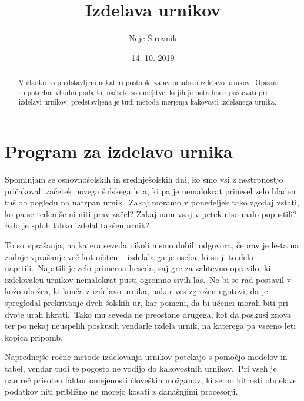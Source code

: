 \documentclass[a4paper,10pt]{article}
\begin{document}

\title{Izdelava urnikov}
\author{Nejc Širovnik}
\date{14. 10. 2019}
\maketitle


\begin{abstract}
   V članku so predstavljeni nekateri postopki za avtomatsko izdelavo urnikov.\ Opisani so
   potrebni vhodni podatki, naštete so omejitve, ki jih je potrebno upoštevati pri izdelavi
   urnikov, predstavljena je tudi metoda merjenja kakovosti izdelanega urnika.
\end{abstract}

\section{Program za izdelavo urnika} %

Spominjam se osnovnošolskih in srednješolskih dni, ko smo vsi z nestrpnostjo pričakovali
začetek novega šolskega leta, ki pa je nemalokrat prinesel zelo hladen tuš ob pogledu na
natrpan urnik.\ Zakaj moramo v ponedeljek tako zgodaj vstati, ko pa se teden še ni niti
prav začel? Zakaj nam vsaj v petek niso malo popustili? Kdo je sploh lahko izdelal
takšen urnik?

To so vprašanja, na katera seveda nikoli nismo dobili odgovora, čeprav je le-ta na zadnje
vprašanje več kot očiten -- izdelala ga je oseba, ki so ji to delo naprtili.\ Naprtili je
zelo primerna beseda, saj gre za zahtevno opravilo, ki izdelovalcu urnikov nemalokrat
pusti ogromno sivih las.\ Ne bi se rad postavil v kožo ubožca, ki konča z izdelavo urnika,
nakar ves zgrožen ugotovi, da je spregledal prekrivanje dveh šolskih ur, kar pomeni, da
bi učenci morali biti pri dvoje urah hkrati.\ Tako mu seveda ne preostane drugega, kot da
poskusi znova ter po nekaj neuspelih poskusih vendarle izdela urnik, na katerega pa vseeno
leti kopica pripomb.

Naprednejše ročne metode izdelovanja urnikov potekajo s pomočjo modelov in tabel, vendar
tudi te pogosto ne vodijo do kakovostnih urnikov.\ Pri vseh je namreč prisoten faktor
omejenosti človeških možganov, ki se po hitrosti obdelave podatkov niti približno ne
morejo kosati z današnjimi procesorji.
\end{document}
